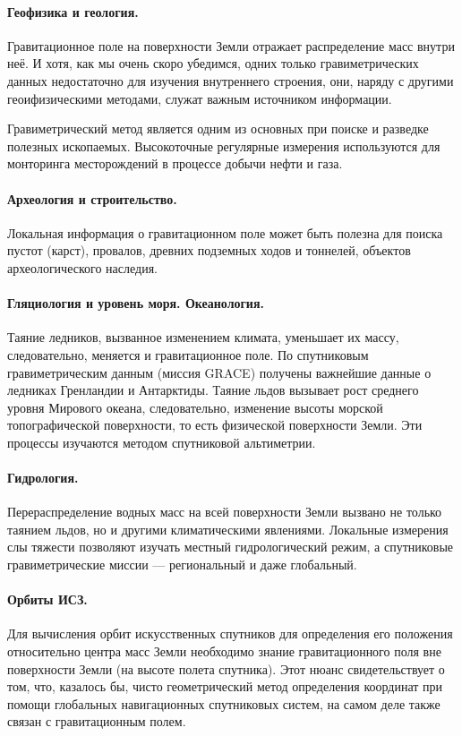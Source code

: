 \documentclass[11pt, a4paper]{article}
\theoremstyle{plain}
\theoremstyle{definition}
\theoremstyle{remark}
\begin{document}
\paragraph{Геофизика и геология.} Гравитационное поле на поверхности Земли отражает распределение масс внутри
неё. И хотя, как мы очень скоро убедимся, одних только гравиметрических данных недостаточно для изучения 
внутреннего строения, они, наряду с другими геоифизическими методами, служат важным источником
информации.\par
Гравиметрический метод является одним из основных при поиске и разведке полезных ископаемых.
Высокоточные регулярные измерения используются для монторинга месторождений в процессе добычи нефти и газа.
\paragraph{Археология и строительство.} Локальная информация о гравитационном поле может быть
полезна для поиска пустот (карст), провалов, древних подземных ходов и тоннелей, объектов археологического
наследия.
\paragraph{Гляциология и уровень моря. Океанология.} Таяние ледников, вызванное изменением климата, уменьшает их
массу, следовательно, меняется и гравитационное поле. По спутниковым гравиметрическим данным (миссия GRACE) получены
важнейшие данные о ледниках Гренландии и Антарктиды. Таяние льдов вызывает рост среднего
уровня Мирового океана, следовательно, изменение высоты морской топографической поверхности, то есть
физической поверхности Земли. Эти процессы изучаются методом спутниковой альтиметрии.
\paragraph{Гидрология.} Перераспределение водных масс на всей поверхности Земли вызвано не только
таянием льдов, но и другими климатическими явлениями. Локальные измерения слы тяжести позволяют
изучать местный гидрологический режим, а спутниковые гравиметрические миссии --- региональный и даже
глобальный. 
\paragraph{Орбиты ИСЗ.} Для вычисления орбит искусственных спутников для определения его положения относительно центра
масс Земли необходимо знание гравитационного поля вне поверхности Земли (на высоте полета спутника). Этот нюанс свидетельствует
о том, что, казалось бы, чисто геометрический метод определения координат при помощи глобальных
навигационных спутниковых систем, на самом деле также связан с гравитационным полем.
\end{document}
